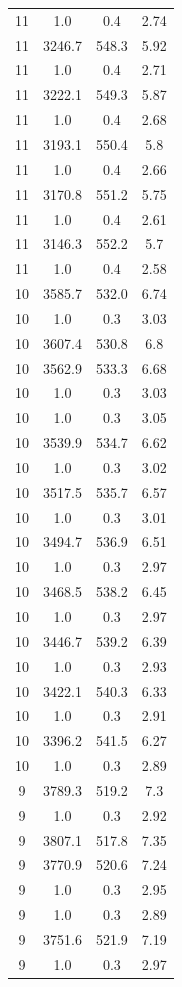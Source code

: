 \begin{table}[htbp]
\begin{tabular}{c c c c}
11 & 1.0 & 0.4 & 2.74 \\
11 & 3246.7 & 548.3 & 5.92 \\
11 & 1.0 & 0.4 & 2.71 \\
11 & 3222.1 & 549.3 & 5.87 \\
11 & 1.0 & 0.4 & 2.68 \\
11 & 3193.1 & 550.4 & 5.8 \\
11 & 1.0 & 0.4 & 2.66 \\
11 & 3170.8 & 551.2 & 5.75 \\
11 & 1.0 & 0.4 & 2.61 \\
11 & 3146.3 & 552.2 & 5.7 \\
11 & 1.0 & 0.4 & 2.58 \\
10 & 3585.7 & 532.0 & 6.74 \\
10 & 1.0 & 0.3 & 3.03 \\
10 & 3607.4 & 530.8 & 6.8 \\
10 & 3562.9 & 533.3 & 6.68 \\
10 & 1.0 & 0.3 & 3.03 \\
10 & 1.0 & 0.3 & 3.05 \\
10 & 3539.9 & 534.7 & 6.62 \\
10 & 1.0 & 0.3 & 3.02 \\
10 & 3517.5 & 535.7 & 6.57 \\
10 & 1.0 & 0.3 & 3.01 \\
10 & 3494.7 & 536.9 & 6.51 \\
10 & 1.0 & 0.3 & 2.97 \\
10 & 3468.5 & 538.2 & 6.45 \\
10 & 1.0 & 0.3 & 2.97 \\
10 & 3446.7 & 539.2 & 6.39 \\
10 & 1.0 & 0.3 & 2.93 \\
10 & 3422.1 & 540.3 & 6.33 \\
10 & 1.0 & 0.3 & 2.91 \\
10 & 3396.2 & 541.5 & 6.27 \\
10 & 1.0 & 0.3 & 2.89 \\
9 & 3789.3 & 519.2 & 7.3 \\
9 & 1.0 & 0.3 & 2.92 \\
9 & 3807.1 & 517.8 & 7.35 \\
9 & 3770.9 & 520.6 & 7.24 \\
9 & 1.0 & 0.3 & 2.95 \\
9 & 1.0 & 0.3 & 2.89 \\
9 & 3751.6 & 521.9 & 7.19 \\
9 & 1.0 & 0.3 & 2.97 \\

\end{tabular}
\end{table}
